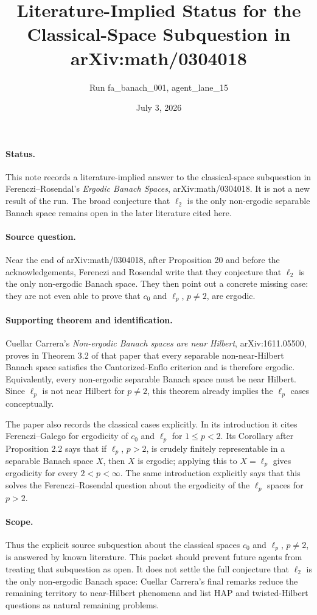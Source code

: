 \documentclass[11pt]{article}
\title{Literature-Implied Status for the Classical-Space Subquestion in arXiv:math/0304018}
\author{Run fa\_banach\_001, agent\_lane\_15}
\date{July 3, 2026}
\begin{document}
\maketitle

\paragraph{Status.}
This note records a literature-implied answer to the classical-space subquestion in Ferenczi--Rosendal's
\emph{Ergodic Banach Spaces}, arXiv:math/0304018. It is not a new result of the run.
The broad conjecture that $\ell_2$ is the only non-ergodic separable Banach space remains open in the later literature cited here.

\paragraph{Source question.}
Near the end of arXiv:math/0304018, after Proposition 20 and before the acknowledgements, Ferenczi and Rosendal write that they conjecture that $\ell_2$ is the only non-ergodic Banach space. They then point out a concrete missing case: they are not even able to prove that $c_0$ and $\ell_p$, $p\neq 2$, are ergodic.

\paragraph{Supporting theorem and identification.}
Cuellar Carrera's \emph{Non-ergodic Banach spaces are near Hilbert}, arXiv:1611.05500, proves in Theorem 3.2 of that paper that every separable non-near-Hilbert Banach space satisfies the Cantorized-Enflo criterion and is therefore ergodic. Equivalently, every non-ergodic separable Banach space must be near Hilbert. Since $\ell_p$ is not near Hilbert for $p\neq 2$, this theorem already implies the $\ell_p$ cases conceptually.

The paper also records the classical cases explicitly. In its introduction it cites Ferenczi--Galego for ergodicity of $c_0$ and $\ell_p$ for $1\leq p<2$. Its Corollary after Proposition 2.2 says that if $\ell_p$, $p>2$, is crudely finitely representable in a separable Banach space $X$, then $X$ is ergodic; applying this to $X=\ell_p$ gives ergodicity for every $2<p<\infty$. The same introduction explicitly says that this solves the Ferenczi--Rosendal question about the ergodicity of the $\ell_p$ spaces for $p>2$.

\paragraph{Scope.}
Thus the explicit source subquestion about the classical spaces $c_0$ and $\ell_p$, $p\neq2$, is answered by known literature. This packet should prevent future agents from treating that subquestion as open. It does not settle the full conjecture that $\ell_2$ is the only non-ergodic Banach space: Cuellar Carrera's final remarks reduce the remaining territory to near-Hilbert phenomena and list HAP and twisted-Hilbert questions as natural remaining problems.
\end{document}
